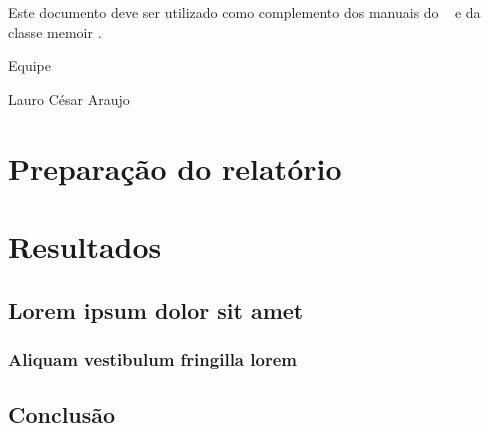 \documentclass[
  12pt,       %
  openright,      %
  twoside,      %
  a4paper,      %
  english,      %
  french,       %
  spanish,      %
  brazil,       %
  ]{abntex2}
\begin{document}
Este documento deve ser utilizado como complemento dos manuais do \abnTeX\
\cite{abntex2classe,abntex2cite,abntex2cite-alf} e da classe \textsf{memoir}
\cite{memoir}.

Equipe \abnTeX

Lauro César Araujo


\part{Preparação do relatório}





\part{Resultados}

\chapter{Lorem ipsum dolor sit amet}

\section{Aliquam vestibulum fringilla lorem}

\lipsum[1]

\lipsum[2-3]


\chapter{Conclusão}

\lipsum[31-33]

\postextual
\end{document}
